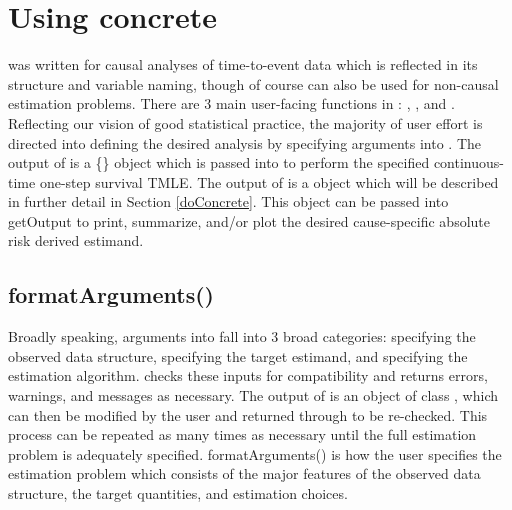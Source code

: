 \documentclass{report}
\newcommand{\1}{\ensuremath{\mathbf{1}}}
\begin{document}
\section{Using concrete}
\label{UsingConcrete}
 was written for causal analyses of time-to-event data which is reflected in its structure and variable naming, though of course  can also be used for non-causal estimation problems. There are 3 main user-facing functions in : , , and . Reflecting our vision of good statistical practice, the majority of user effort is directed into defining the desired analysis by specifying arguments into . The output of  is a \code\{\} object which is passed into  to perform the specified continuous-time one-step survival TMLE. The output of  is a  object which will be described in further detail in Section \ref{doConcrete}. This  object can be passed into getOutput to print, summarize, and/or plot the desired cause-specific absolute risk derived estimand.

\subsection{formatArguments()}
\label{formatArguments}
Broadly speaking, arguments into  fall into 3 broad categories: specifying the observed data structure, specifying the target estimand, and specifying the estimation algorithm.  checks these inputs for compatibility and returns errors, warnings, and messages as necessary. The output of  is an object of class , which can then be modified by the user and returned through  to be re-checked. This process can be repeated as many times as necessary until the full estimation problem is adequately specified. formatArguments() is how the user specifies the estimation problem which consists of the major features of the observed data structure, the target quantities, and estimation choices.
\end{document}

